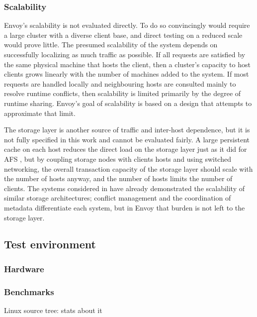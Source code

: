 \subsubsection{Scalability}

Envoy's scalability is not evaluated directly. To do so convincingly would require a large cluster with a diverse client base, and direct testing on a reduced scale would prove little. The presumed scalability of the system depends on successfully localizing as much traffic as possible. If all requests are satisfied by the same physical machine that hosts the client, then a cluster's capacity to host clients grows linearly with the number of machines added to the system. If most requests are handled locally and neighbouring hosts are consulted mainly to resolve runtime conflicts, then scalability is limited primarily by the degree of runtime sharing. Envoy's goal of scalability is based on a design that attempts to approximate that limit.

The storage layer is another source of traffic and inter-host dependence, but it is not fully specified in this work and cannot be evaluated fairly. A large persistent cache on each host reduces the direct load on the storage layer just as it did for AFS \cite{satyanarayanan85}, but by coupling storage nodes with clients hosts and using switched networking, the overall transaction capacity of the storage layer should scale with the number of hosts anyway, and the number of hosts limits the number of clients. The systems considered in  have already demonstrated the scalability of similar storage architectures; conflict management and the coordination of metadata differentiate each system, but in Envoy that burden is not left to the storage layer.

\subsection{Test environment}

\subsubsection{Hardware}

\subsubsection{Benchmarks}

Linux source tree: stats about it

